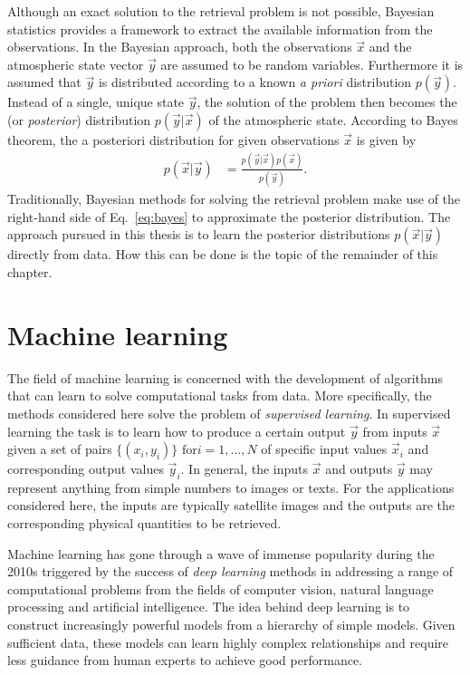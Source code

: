 Although an exact solution to the retrieval problem is not possible, Bayesian
statistics provides a framework to extract the available information from the
observations. In the Bayesian approach, both the observations $\vec{x}$ and the
atmospheric state vector $\vec{y}$ are assumed to be random variables.
Furthermore it is assumed that $\vec{y}$ is distributed according to a known
\textit{a priori} distribution $p(\vec{y})$. Instead of a single, unique state
$\vec{y}$, the solution of the problem then becomes the  (or
\textit{posterior}) distribution $p(\vec{y} | \vec{x})$ of the atmospheric
state. According to Bayes theorem, the a posteriori distribution for given
observations $\vec{x}$ is given by
\begin{align}\label{eq:bayes}
  p(\vec{x} | \vec{y}) &= \frac{p(\vec{y}|\vec{x})
  p(\vec{x})}{p(\vec{y})}.
\end{align}
Traditionally, Bayesian methods for solving the retrieval problem make use of
the right-hand side of Eq.~\ref{eq:bayes} to approximate the posterior
distribution. The approach pursued in this thesis is to learn the posterior
distributions $p(\vec{x}|\vec{y})$ directly from data. How this can be done is
the topic of the remainder of this chapter.

\section{Machine learning}


The field of machine learning is concerned with the development of algorithms
that can learn to solve computational tasks from data. More specifically, the
methods considered here solve the problem of \textit{supervised learning}. In
supervised learning the task is to learn how to produce a certain output
$\vec{y}$ from inputs $\vec{x}$ given a set of pairs $\{(x_i, y_i)\}\text{ for
}i = 1, \ldots, N$ of specific input values $\vec{x}_i$ and corresponding output
values $\vec{y}_i$. In general, the inputs $\vec{x}$ and outputs $\vec{y}$ may
represent anything from simple numbers to images or texts. For the applications
considered here, the inputs are typically satellite images and the outputs are
the corresponding physical quantities to be retrieved.

Machine learning has gone through a wave of immense popularity during the 2010s
triggered by the success of \textit{deep learning} methods in addressing a range
of computational problems from the fields of computer vision, natural language
processing and artificial intelligence. The idea behind deep learning is to
construct increasingly powerful models from a hierarchy of simple models.
Given sufficient data, these models can learn highly complex relationships and
require less guidance from human experts to achieve good performance.

